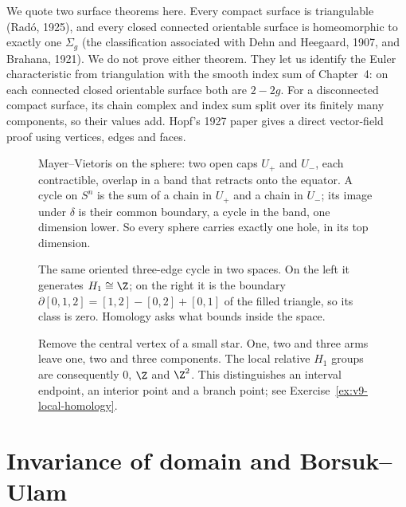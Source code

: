 \begin{remark}
We quote two surface theorems here. Every compact surface is triangulable (Rad\'o, 1925), and every closed connected orientable surface is homeomorphic to exactly one $\Sigma_g$ (the classification associated with Dehn and Heegaard, 1907, and Brahana, 1921). We do not prove either theorem. They let us identify the Euler characteristic from triangulation with the smooth index sum of Chapter~4: on each connected closed orientable surface both are $2-2g$. For a disconnected compact surface, its chain complex and index sum split over its finitely many components, so their values add. Hopf's 1927 paper gives a direct vector-field proof using vertices, edges and faces.
\end{remark}

\begin{figure}[ht]
\centering
{}
\caption{Mayer--Vietoris on the sphere: two open caps $U_+$ and $U_-$, each contractible, overlap in a band that retracts onto the equator. A cycle on $S^n$ is the sum of a chain in $U_+$
and a chain in $U_-$; its image under $\delta$ is their common boundary, a cycle in the band, one dimension lower. So every sphere carries exactly one hole, in its top dimension.}
\label{fig:mvsphere}
\end{figure}

\begin{figure}[ht]
\centering
{}
\caption{The same oriented three-edge cycle in two spaces. On the left it generates $H_1\cong\Z$; on the right it is the boundary $\partial[0,1,2]=[1,2]-[0,2]+[0,1]$ of the filled triangle, so its class is zero. Homology asks what bounds inside the space.}
\label{fig:v9-filled-cycle}
\end{figure}

\begin{figure}[ht]
\centering
{}
\caption{Remove the central vertex of a small star. One, two and three arms leave one, two and three components. The local relative $H_1$ groups are consequently $0$, $\Z$ and $\Z^2$. This distinguishes an interval endpoint, an interior point and a branch point; see Exercise~\ref{ex:v9-local-homology}.}
\label{fig:v9-local-stars}
\end{figure}

\section{Invariance of domain and Borsuk--Ulam}


